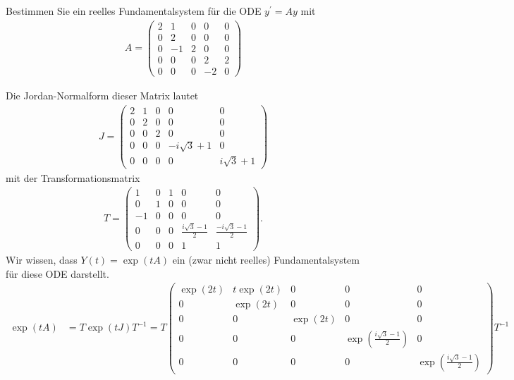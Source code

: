 \begin{exercise}
Bestimmen Sie ein reelles Fundamentalsystem für die ODE $y^{\prime}
= Ay$ mit
\begin{align*}
  A = \begin{pmatrix}
    2 & 1 & 0 & 0 & 0 \\
    0 & 2 & 0 & 0 & 0 \\
    0 & -1 & 2 & 0 & 0 \\
    0 & 0 & 0 & 2 & 2 \\
    0 & 0 & 0 & -2 & 0
  \end{pmatrix}
\end{align*}
\end{exercise}
\begin{solution}
Die Jordan-Normalform dieser Matrix lautet
\begin{align*}
J = \begin{pmatrix}
  2 & 1 & 0 & 0 & 0 \\
  0 & 2 & 0 & 0 & 0 \\
  0 & 0 & 2 & 0 & 0 \\
  0 & 0 & 0 & -i\sqrt{3} + 1  & 0 \\
  0 & 0 & 0 & 0 & i\sqrt{3} + 1
\end{pmatrix}
\end{align*}
mit der Transformationsmatrix
\begin{align*}
T =
\begin{pmatrix}
  1 & 0 & 1 & 0 & 0 \\
  0 & 1 & 0 & 0 & 0 \\
  -1 & 0 & 0 & 0 & 0 \\
  0 & 0 & 0 & \frac{i\sqrt{3} - 1}{2}  & \frac{-i\sqrt{3} - 1}{2} \\
  0 & 0 & 0 & 1 & 1
\end{pmatrix}.
\end{align*}
Wir wissen, dass $Y(t) = \exp(tA)$ ein (zwar nicht reelles) Fundamentalsystem für diese ODE darstellt.
\begin{align*}
  \exp(tA) &= T\exp(tJ)T^{-1}
  = T\begin{pmatrix}
    \exp(2t) & t\exp(2t) & 0 & 0 & 0 \\
    0 & \exp(2t) & 0 & 0 & 0 \\
    0 & 0 & \exp(2t) & 0 & 0 \\
    0 & 0 & 0 & \exp(\frac{i\sqrt{3} - 1}{2}) & 0 \\
    0 & 0 & 0 & 0 & \exp(\frac{i\sqrt{3} - 1}{2})
  \end{pmatrix}T^{-1} \\

\end{align*}
\end{solution}
